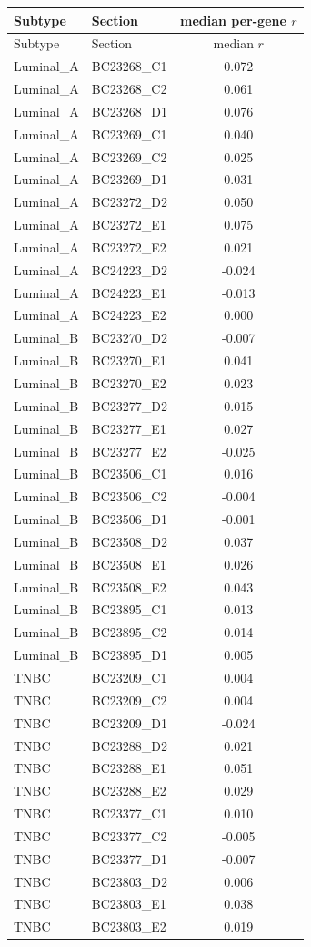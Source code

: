 \begin{longtable}{llc}\toprule
Subtype & Section & median per-gene $r$ \\
\midrule
\endfirsthead
\toprule Subtype & Section & median $r$ \\ \midrule \endhead
Luminal\_A & BC23268\_C1 & 0.072 \\
Luminal\_A & BC23268\_C2 & 0.061 \\
Luminal\_A & BC23268\_D1 & 0.076 \\
Luminal\_A & BC23269\_C1 & 0.040 \\
Luminal\_A & BC23269\_C2 & 0.025 \\
Luminal\_A & BC23269\_D1 & 0.031 \\
Luminal\_A & BC23272\_D2 & 0.050 \\
Luminal\_A & BC23272\_E1 & 0.075 \\
Luminal\_A & BC23272\_E2 & 0.021 \\
Luminal\_A & BC24223\_D2 & -0.024 \\
Luminal\_A & BC24223\_E1 & -0.013 \\
Luminal\_A & BC24223\_E2 & 0.000 \\
Luminal\_B & BC23270\_D2 & -0.007 \\
Luminal\_B & BC23270\_E1 & 0.041 \\
Luminal\_B & BC23270\_E2 & 0.023 \\
Luminal\_B & BC23277\_D2 & 0.015 \\
Luminal\_B & BC23277\_E1 & 0.027 \\
Luminal\_B & BC23277\_E2 & -0.025 \\
Luminal\_B & BC23506\_C1 & 0.016 \\
Luminal\_B & BC23506\_C2 & -0.004 \\
Luminal\_B & BC23506\_D1 & -0.001 \\
Luminal\_B & BC23508\_D2 & 0.037 \\
Luminal\_B & BC23508\_E1 & 0.026 \\
Luminal\_B & BC23508\_E2 & 0.043 \\
Luminal\_B & BC23895\_C1 & 0.013 \\
Luminal\_B & BC23895\_C2 & 0.014 \\
Luminal\_B & BC23895\_D1 & 0.005 \\
TNBC & BC23209\_C1 & 0.004 \\
TNBC & BC23209\_C2 & 0.004 \\
TNBC & BC23209\_D1 & -0.024 \\
TNBC & BC23288\_D2 & 0.021 \\
TNBC & BC23288\_E1 & 0.051 \\
TNBC & BC23288\_E2 & 0.029 \\
TNBC & BC23377\_C1 & 0.010 \\
TNBC & BC23377\_C2 & -0.005 \\
TNBC & BC23377\_D1 & -0.007 \\
TNBC & BC23803\_D2 & 0.006 \\
TNBC & BC23803\_E1 & 0.038 \\
TNBC & BC23803\_E2 & 0.019 \\
\bottomrule
\end{longtable}
